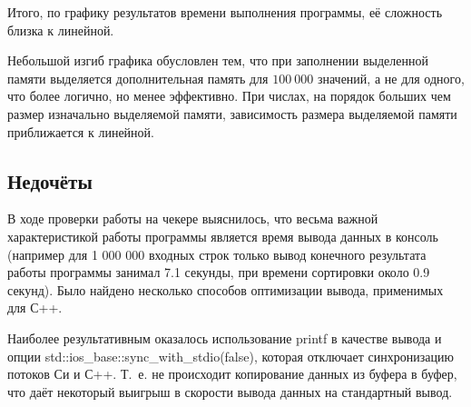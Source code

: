 \documentclass[12pt]{article}
\begin{document}
Итого, по графику результатов времени выполнения программы, её сложность близка к линейной.
\\


Небольшой изгиб графика обусловлен тем, что при заполнении выделенной памяти выделяется дополнительная память для $100\ 000$ значений, а не для одного, что более логично, но менее эффективно. При числах, на порядок больших чем размер изначально выделяемой памяти, зависимость размера выделяемой памяти приближается к линейной.




\subsection*{Недочёты}

В ходе проверки работы на чекере выяснилось, что весьма важной характеристикой работы программы является время вывода данных в консоль (например для 1 000 000 входных строк только вывод конечного результата работы программы занимал 7.1 секунды, при времени сортировки около 0.9 секунд). Было найдено несколько способов оптимизации вывода, применимых для С++. 

Наиболее результативным оказалось использование printf в качестве вывода и опции std::ios\_base::sync\_with\_stdio(false), которая отключает синхронизацию потоков Си и С++. Т.~е. не происходит копирование данных из буфера в буфер, что даёт некоторый выигрыш в скорости вывода данных на стандартный вывод.

\end{document}
